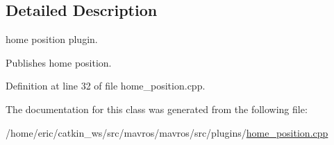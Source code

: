 \subsection{Detailed Description}
home position plugin. 

Publishes home position. 

Definition at line 32 of file home\+\_\+position.\+cpp.



The documentation for this class was generated from the following file\+:\begin{DoxyCompactItemize}
\item 
/home/eric/catkin\+\_\+ws/src/mavros/mavros/src/plugins/\mbox{\hyperlink{home__position_8cpp}{home\+\_\+position.\+cpp}}\end{DoxyCompactItemize}
